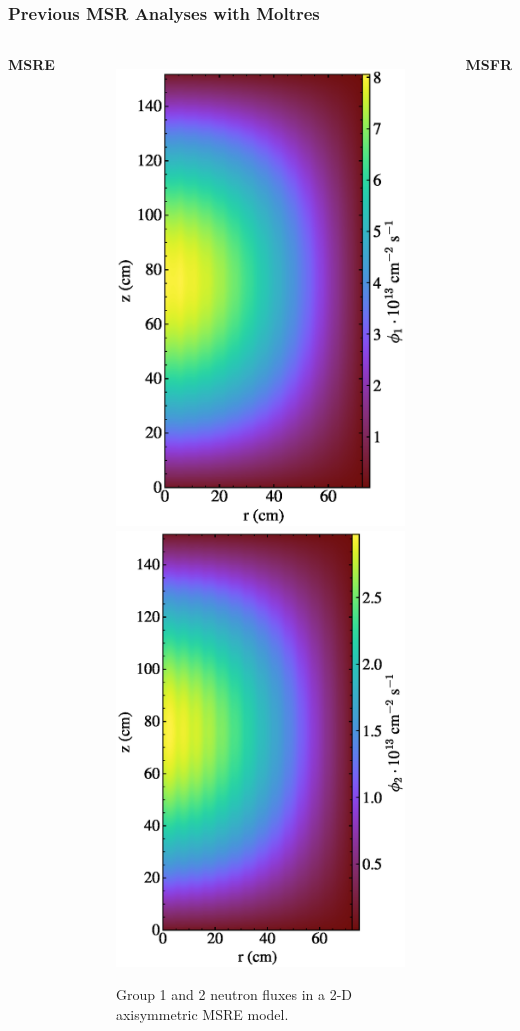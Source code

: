 \begin{frame}
  \frametitle{Previous MSR Analyses with Moltres}
  \begin{columns}
    \hfill
    \column[t]{4cm}
      \textbf{MSRE \cite{lindsay_moltres_2017}}
      \vfill
      \begin{figure}
        \centering
	    \includegraphics[width=.48\columnwidth]{../images/2d_gamma_heating_group1}
        \hfill
	    \includegraphics[width=.48\columnwidth]{../images/2d_gamma_heating_group2}
	    \caption{\footnotesize Group 1 and 2 neutron fluxes in a 2-D axisymmetric MSRE
	      model.}
      \end{figure}
    \hfill
    \column[t]{3.5cm}
      \textbf{MSFR \cite{park_advancement_2020}}
      \vfill

\end{columns}
\end{frame}
